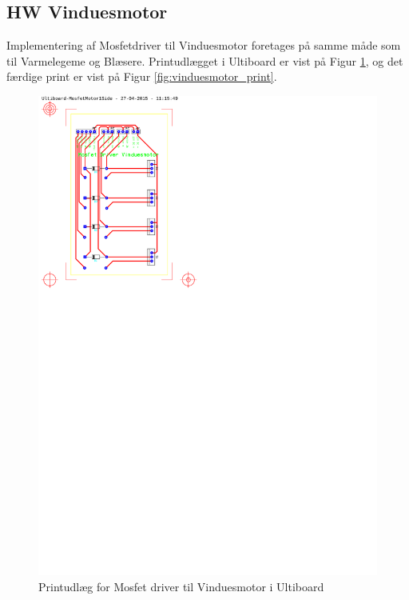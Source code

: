 \clearpage

\subsection{HW Vinduesmotor}

Implementering af Mosfetdriver til Vinduesmotor foretages på samme måde som til Varmelegeme og Blæsere.
Printudlægget i Ultiboard er vist på Figur \ref{fig:ultiboard_vinduesmotor}, og det færdige print er vist på Figur \ref{fig:vinduesmotor_print}. %

\begin{figure}[h]
\centering 
\includegraphics[width={\textwidth-6cm}, trim=50 520 365 30, clip=true, angle =90] {../fig/ultiboard_vinduesmotor.pdf} %
\caption{Printudlæg for Mosfet driver til Vinduesmotor i Ultiboard}
\label{fig:ultiboard_vinduesmotor}
\end{figure}

